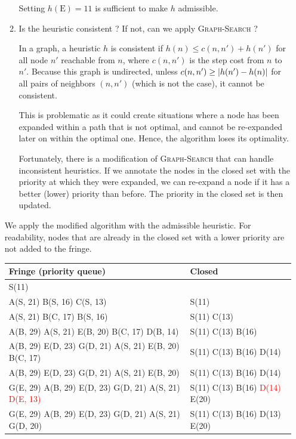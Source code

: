 \documentclass[11pt, a4paper]{article}
\begin{document}
\begin{enumerate}
\begin{enumerate}
\begin{solution}
            Setting $h(\text{E}) = 11$ is sufficient to make $h$ admissible.
        \end{solution}

        \item Is the heuristic consistent ? If not, can we apply \textsc{Graph-Search} ?

        \begin{solution}
            In a graph, a heuristic $h$ is consistent if $h(n) \leq c(n, n') + h(n')$ for all node $n'$ reachable from $n$, where $c(n, n')$ is the step cost from $n$ to $n'$. Because this graph is undirected, unless $c(n, n') \geq \lvert h(n') - h(n)\rvert$ for all pairs of neighbors $(n, n')$ (which is not the case), it cannot be consistent.

            This is problematic as it could create situations where a node has been expanded within a path that is not optimal, and cannot be re-expanded later on within the optimal one. Hence, the algorithm loses its optimality.

            Fortunately, there is a modification of \textsc{Graph-Search} that can handle inconsistent heuristics. If we annotate the nodes in the closed set with the priority at which they were expanded, we can re-expand a node if it has a better (lower) priority than before. The priority in the closed set is then updated.
        \end{solution}
    \end{enumerate}

    \begin{solution}
        We apply the modified algorithm with the admissible heuristic. For readability, nodes that are already in the closed set with a lower priority are not added to the fringe.

        \begin{table}[h]
            \centering
            \begin{tabular}{l|l}
                \toprule
                Fringe (priority queue) & Closed \\
                \midrule
                S(11) & \\
                A(S, 21) B(S, 16) C(S, 13) & S(11) \\
                A(S, 21) B(C, 17) B(S, 16) & S(11) C(13) \\
                A(B, 29) A(S, 21) E(B, 20) B(C, 17) D(B, 14) & S(11) C(13) B(16) \\
                A(B, 29) E(D, 23) G(D, 21) A(S, 21) E(B, 20) B(C, 17) & S(11) C(13) B(16) D(14) \\
                A(B, 29) E(D, 23) G(D, 21) A(S, 21) E(B, 20) & S(11) C(13) B(16) D(14) \\
                G(E, 29) A(B, 29) E(D, 23) G(D, 21) A(S, 21) \textcolor{red}{D(E, 13)} & S(11) C(13) B(16) \textcolor{red}{D(14)} E(20) \\
                G(E, 29) A(B, 29) E(D, 23) G(D, 21) A(S, 21) G(D, 20) & S(11) C(13) B(16) D(13) E(20) \\
                \bottomrule
            \end{tabular}
        \end{table}


\end{solution}
\end{enumerate}
\end{document}
